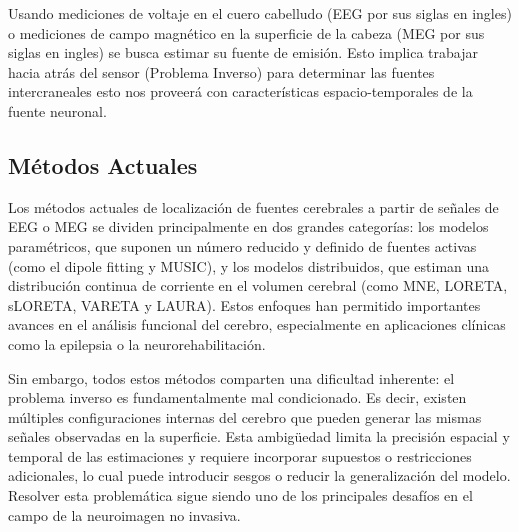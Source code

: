 
        Usando mediciones de voltaje en el cuero cabelludo (EEG por sus siglas en ingles) o mediciones de campo magnético en la superficie de la cabeza (MEG por sus siglas en ingles) se busca estimar su fuente de emisión. Esto implica trabajar hacia atrás del sensor (Problema Inverso) para determinar las fuentes intercraneales esto nos proveerá con características espacio-temporales de la fuente neuronal.

    \subsection{Métodos Actuales}
    Los métodos actuales de localización de fuentes cerebrales a partir de señales de EEG o MEG se dividen principalmente en dos grandes categorías: los modelos paramétricos, que suponen un número reducido y definido de fuentes activas (como el dipole fitting y MUSIC), y los modelos distribuidos, que estiman una distribución continua de corriente en el volumen cerebral (como MNE, LORETA, sLORETA, VARETA y LAURA). Estos enfoques han permitido importantes avances en el análisis funcional del cerebro, especialmente en aplicaciones clínicas como la epilepsia o la neurorehabilitación.

    Sin embargo, todos estos métodos comparten una dificultad inherente: el problema inverso es fundamentalmente mal condicionado. Es decir, existen múltiples configuraciones internas del cerebro que pueden generar las mismas señales observadas en la superficie. Esta ambigüedad limita la precisión espacial y temporal de las estimaciones y requiere incorporar supuestos o restricciones adicionales, lo cual puede introducir sesgos o reducir la generalización del modelo. Resolver esta problemática sigue siendo uno de los principales desafíos en el campo de la neuroimagen no invasiva.